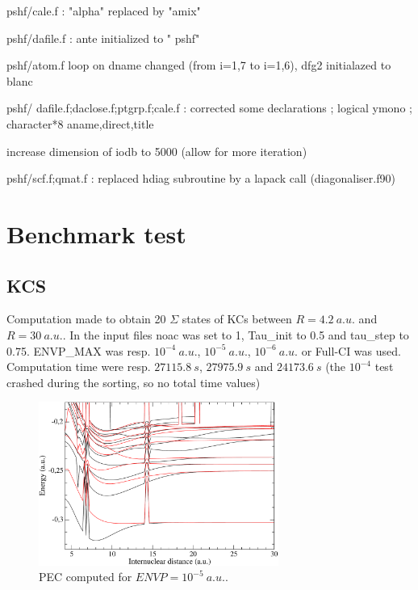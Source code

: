 \documentclass[a4paper,10pt]{article}
\begin{document}
\begin{description}
\item pshf/cale.f : "alpha" replaced by "amix"
\item pshf/dafile.f : ante initialized to "  pshf"
\item pshf/atom.f loop on dname changed (from i=1,7 to i=1,6), dfg2 initialazed to blanc
\item pshf/ dafile.f;daclose.f;ptgrp.f;cale.f : corrected some declarations ; logical ymono ; character*8 aname,direct,title
\item increase dimension of iodb to 5000 (allow for more iteration)
\item pshf/scf.f;qmat.f : replaced hdiag subroutine by a lapack call (diagonaliser.f90)
\end{description}

\section{Benchmark test}

\subsection{KCS}

Computation made to obtain 20 $\Sigma$ states of KCs between $R=4.2~a.u.$ and $R=30~a.u.$. In the input files noac was set to 1, Tau\_init to 0.5 and tau\_step to 0.75. ENVP\_MAX was resp. $10^{-4}~a.u.$, $10^{-5}~a.u.$, $10^{-6}~a.u.$ or Full-CI was used. Computation time were resp. $27115.8~s$, $27975.9~s$ and $24173.6~s$ (the $10^{-4}$ test crashed during the sorting, so no total time values)

 \begin{figure}[htbp]
  \begin{center}
        \includegraphics[width=0.7\textwidth]{fig/KCs_tau5.pdf}
    \caption{\label{PEC} \small PEC computed for $ENVP=10^{-5}~a.u.$.}
  \end{center}
\end{figure}
\end{document}
